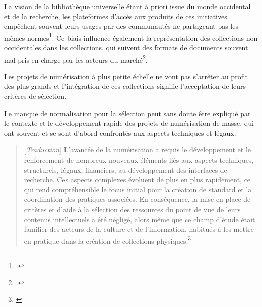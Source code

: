 La vision de la bibliothèque universelle étant à priori issue du monde occidental et de la recherche, les plateformes d'accès aux produits de ces initiatives empêchent souvent leurs usages par des communautés ne partageant pas les mêmes normes\footcite{jones_public_2017}. Ce biais influence également la représentation des collections non occidentales dans les collections, qui suivent des formats de documents souvent mal pris en charge par les acteurs du marché\footcite{weiss_examining_2016}. 

Les projets de numérisation à plus petite échelle ne vont pas s'arrêter au profit des plus grands et l'intégration de ces collections signifie l'acceptation de leurs critères de sélection. 

Le manque de normalisation pour la sélection peut sans doute être expliqué par le contexte et le développement rapide des projets de numérisation de masse, qui ont souvent  et se sont d'abord confrontés aux aspects techniques et légaux.

\begin{quotation}
[\textit{Traduction}] L'avancée de la numérisation a requis le développement et le renforcement de nombreux nouveaux éléments liés aux aspects techniques, structurels, légaux, financiers, au développement des interfaces de recherche. Ces aspects complexes évoluent de plus en plus rapidement, ce qui rend compréhensible le focus initial pour la création de standard et la coordination des pratiques associées. En conséquence, la mise en place de critères et d'aide à la sélection des ressources du point de vue de leurs contenus intellectuels a été négligé, alors même que ce champ d'étude était familier des acteurs de la culture et de l'information, habitués à les mettre en pratique dans la création de collections physiques.\footnote{\textit{}}
\end{quotation}

